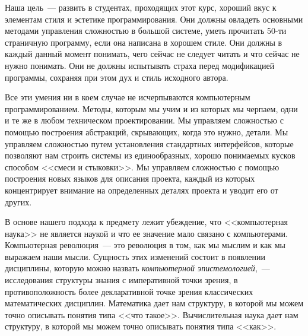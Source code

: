 Наша цель~--- развить в студентах, проходящих этот
курс, хороший вкус к элементам стиля и эстетике
программирования.  Они должны овладеть основными методами управления
сложностью в большой системе, уметь прочитать
50-ти страничную программу, если она написана в хорошем стиле.  Они
должны в каждый данный момент понимать, чего сейчас не следует читать и
что сейчас не нужно понимать.  Они не должны испытывать страха
перед модификацией программы, сохраняя при этом дух и стиль исходного
автора.

Все эти умения ни в коем случае не исчерпываются
компьютерным программированием.  Методы, которым мы учим и из которых
мы черпаем, одни и те же в любом техническом проектировании.  Мы
управляем сложностью с помощью построения абстракций, скрывающих,
когда это нужно, 
детали.  Мы управляем сложностью путем установления
стандартных интерфейсов, которые позволяют нам строить системы из
единообразных, хорошо понимаемых кусков способом <<смеси и стыковки>>. Мы 
управляем сложностью с помощью построения новых языков для описания
проекта, каждый из которых концентрирует внимание на определенных
деталях проекта и уводит его от других.

В основе нашего подхода к предмету лежит убеждение, что
<<компьютерная наука>> не является наукой и что ее значение мало
связано с компьютерами. Компьютерная революция~--- это революция в том, 
как мы мыслим и как мы выражаем наши мысли.  Сущность этих изменений
состоит в появлении дисциплины, которую можно назвать
{\em компьютерной эпистемологией},~--- исследования
структуры знания с императивной точки зрения, в противоположность
более декларативной точке зрения классических математических
дисциплин.  Математика дает нам структуру, в которой мы можем точно
описывать понятия типа <<что такое>>.  Вычислительная наука дает нам
структуру, в которой мы можем точно описывать понятия типа
<<как>>.

